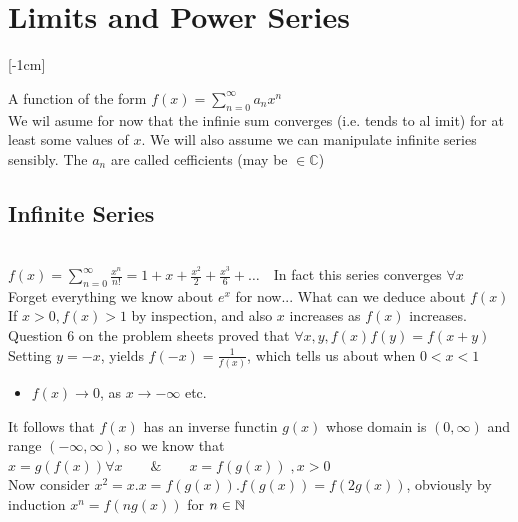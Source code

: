 \pagebreak

\chapter{Limits and Power Series} [-1cm]


A function of the form $f(x) = \sum_{n=0}^{\infty} a_n x^n$ \\

We wil asume for now that the infinie sum converges (i.e. tends to al imit) for at least some values of $x$. We will also assume we can manipulate infinite series sensibly. The $a_n$ are called cefficients (may be $\in \mathbb{C}$)\\

\pagebreak
\section{Infinite Series}
\\

$f(x) = \sum_{n=0}^{\infty} \frac{x^n}{n!} = 1 + x + \frac{x^2}{2} + \frac{x^3}{6} + \dots \quad$In fact this series converges $\forall x$\\

Forget everything we know about $e^x$ for now... What can we deduce about $f(x)$\\

If $x>0, f(x) > 1$ by inspection, and also $x$ increases as $f(x)$ increases.\\

Question 6 on the problem sheets proved that $\forall x,y, f(x)f(y) = f(x+y)$\\

Setting $y = -x$, yields $f(-x) = \frac{1}{f(x)}$, which tells us about when $ 0<x <1$
\begin{itemize}
\item $f(x) \to 0$, as $x \to -\infty$ etc. 
\end{itemize}


It follows that $f(x)$ has an inverse functin $g(x)$ whose domain is $(0,\infty)$ and range $(-\infty,\infty)$, so we know that $x = g(f(x)) \forall x \qquad \& \qquad x = f(g(x)) \; , x>0$\\

Now consider $x^2 = x.x = f(g(x)) .f(g(x)) = f(2g(x))$, obviously by induction $x^n = f(ng(x))$ for $n \in \mathbb{N}$\\

